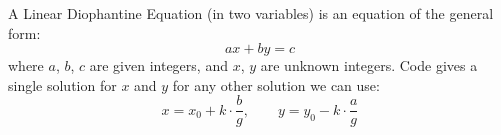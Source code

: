 A Linear Diophantine Equation (in two variables) is an equation of the general form:
$$ax + by = c$$
where $a$, $b$, $c$ are given integers, and $x$, $y$ are unknown integers. Code gives a single solution for $x$ and $y$ for any other solution we can use:
$$x = x_0 + k \cdot \frac{b}{g}, \qquad y = y_0 - k \cdot \frac{a}{g}$$